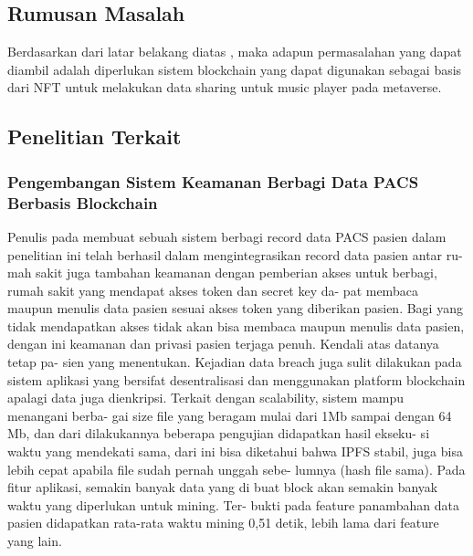 \subsection{Rumusan Masalah}

Berdasarkan dari latar belakang diatas , maka adapun permasalahan yang dapat diambil adalah diperlukan sistem blockchain yang dapat digunakan sebagai basis dari NFT untuk melakukan data sharing untuk music player pada metaverse. 

\subsection{Penelitian Terkait}

\subsubsection{Pengembangan Sistem Keamanan Berbagi Data PACS Berbasis Blockchain}
Penulis pada \citep{DitoPrabowo2020} membuat sebuah sistem berbagi record data PACS pasien dalam penelitian ini
telah berhasil dalam mengintegrasikan record data pasien antar ru-
mah sakit juga tambahan keamanan dengan pemberian akses untuk
berbagi, rumah sakit yang mendapat akses token dan secret key da-
pat membaca maupun menulis data pasien sesuai akses token yang
diberikan pasien. Bagi yang tidak mendapatkan akses tidak akan
bisa membaca maupun menulis data pasien, dengan ini keamanan
dan privasi pasien terjaga penuh. Kendali atas datanya tetap pa-
sien yang menentukan. Kejadian data breach juga sulit dilakukan
pada sistem aplikasi yang bersifat desentralisasi dan menggunakan
platform blockchain apalagi data juga dienkripsi.
Terkait dengan scalability, sistem mampu menangani berba-
gai size file yang beragam mulai dari 1Mb sampai dengan 64 Mb,
dan dari dilakukannya beberapa pengujian didapatkan hasil ekseku-
si waktu yang mendekati sama, dari ini bisa diketahui bahwa IPFS
stabil, juga bisa lebih cepat apabila file sudah pernah unggah sebe-
lumnya (hash file sama).
Pada fitur aplikasi, semakin banyak data yang di buat block
akan semakin banyak waktu yang diperlukan untuk mining. Ter-
bukti pada feature panambahan data pasien didapatkan rata-rata
waktu mining 0,51 detik, lebih lama dari feature yang lain.

